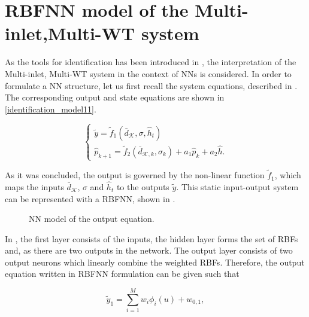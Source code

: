 \section{RBFNN model of the Multi-inlet,Multi-WT system}
\label{RBFNN_model_multi_inlet_multi_WT_sys} 

As the tools for identification has been introduced in  , the interpretation of the Multi-inlet, Multi-WT system in the context of NNs is considered. In order to formulate a NN structure, let us first recall the system equations, described in . The corresponding output and state equations are shown in \eqref{identification_model11}. 

\begin{equation}
\begin{cases}
  \label{identification_model11}
    \tilde{y}  = \tilde{f}_1(\bar{d}_{\mathcal{K}}, \sigma, \hat{h}_t )\\
  \hat{p}_{k+1} = \tilde{f}_2(\bar{d}_{\mathcal{K},k}, \sigma_k) + a_1 \hat{p}_k + a_2 \hat{h} .
  \end{cases}
\end{equation} 

As it was concluded, the output is governed by the non-linear function $\tilde{f}_1$, which maps the inputs $\bar{d}_{\mathcal{K}}$, $\sigma$ and $\hat{h}_t $ to the outputs $\tilde{y}$. This static input-output system can be represented with a RBFNN, shown in .

 \begin{figure}[H]
 \centering
  
  \vspace{-7mm}
 \caption{NN model of the output equation.}
 \label{fig:nn_output}
 \end{figure}

 \vspace{-3mm}

 In , the first layer consists of the inputs, the hidden layer forms the set of RBFs and, as there are two outputs in the network. The output layer consists of two output neurons which linearly combine the weighted RBFs. Therefore, the output equation written in RBFNN formulation can be given such that 

  \begin{equation}
\label{NN_output_eq1}
\tilde{y}_1 = \sum_{i = 1}^M w_i \phi_i(u) +  w_{0,1},
\end{equation}

